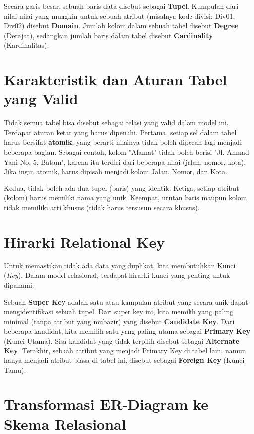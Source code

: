 \documentclass[11pt,a4paper]{article}
\begin{document}
Secara garis besar, sebuah baris data disebut sebagai \textbf{Tupel}. Kumpulan dari nilai-nilai yang mungkin untuk sebuah atribut (misalnya kode divisi: Div01, Div02) disebut \textbf{Domain}. Jumlah kolom dalam sebuah tabel disebut \textbf{Degree} (Derajat), sedangkan jumlah baris dalam tabel disebut \textbf{Cardinality} (Kardinalitas).

\section{Karakteristik dan Aturan Tabel yang Valid}

Tidak semua tabel bisa disebut sebagai relasi yang valid dalam model ini. Terdapat aturan ketat yang harus dipenuhi. Pertama, setiap sel dalam tabel harus bersifat \textbf{atomik}, yang berarti nilainya tidak boleh dipecah lagi menjadi beberapa bagian. Sebagai contoh, kolom "Alamat" tidak boleh berisi "Jl. Ahmad Yani No. 5, Batam", karena itu terdiri dari beberapa nilai (jalan, nomor, kota). Jika ingin atomik, harus dipisah menjadi kolom Jalan, Nomor, dan Kota.

Kedua, tidak boleh ada dua tupel (baris) yang identik. Ketiga, setiap atribut (kolom) harus memiliki nama yang unik. Keempat, urutan baris maupun kolom tidak memiliki arti khusus (tidak harus tersusun secara khusus).

\section{Hirarki Relational Key}

Untuk memastikan tidak ada data yang duplikat, kita membutuhkan Kunci (\textit{Key}). Dalam model relasional, terdapat hirarki kunci yang penting untuk dipahami:

Sebuah \textbf{Super Key} adalah satu atau kumpulan atribut yang secara unik dapat mengidentifikasi sebuah tupel. Dari super key ini, kita memilih yang paling minimal (tanpa atribut yang mubazir) yang disebut \textbf{Candidate Key}. Dari beberapa kandidat, kita memilih satu yang paling utama sebagai \textbf{Primary Key} (Kunci Utama). Sisa kandidat yang tidak terpilih disebut sebagai \textbf{Alternate Key}. Terakhir, sebuah atribut yang menjadi Primary Key di tabel lain, namun hanya menjadi atribut biasa di tabel ini, disebut sebagai \textbf{Foreign Key} (Kunci Tamu).

\section{Transformasi ER-Diagram ke Skema Relasional}
\end{document}
